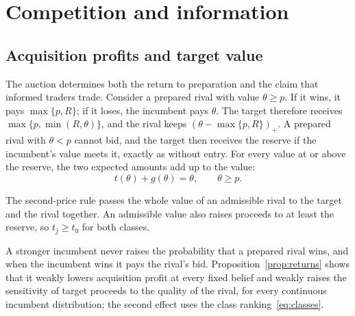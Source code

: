 \section{Competition and information}\label{sec:payoffs}

\subsection{Acquisition profits and target value}\label{sec:profits}

The auction determines both the return to preparation and the claim that informed traders trade. Consider a
prepared rival with value \(\theta\ge p\). If it wins, it pays \(\max\{p,R\}\); if it loses, the
incumbent pays \(\theta\). The target therefore receives \(\max\{p,\min(R,\theta)\}\), and the rival
keeps \((\theta-\max\{p,R\})_+\). A prepared rival with \(\theta<p\) cannot bid, and the target then
receives the reserve if the incumbent's value meets it, exactly as without entry. For every value at or above
the reserve, the two expected amounts add up to the value:
\[
t(\theta)+g(\theta)=\theta,\qquad \theta\ge p.
\]

The second-price rule passes the whole value of an admissible rival to the target and the rival
together. An admissible value also raises proceeds to at least the reserve, so \(t_j\ge t_0\) for both
classes.

A stronger incumbent never raises the probability that a prepared rival wins, and when the incumbent wins it
pays the rival's bid.
Proposition~\ref{prop:returns} shows that it weakly lowers acquisition profit at every fixed belief and weakly
raises the sensitivity of target proceeds to the quality of the rival, for every continuous incumbent distribution; the
second effect uses the class ranking~\eqref{eq:classes}.

